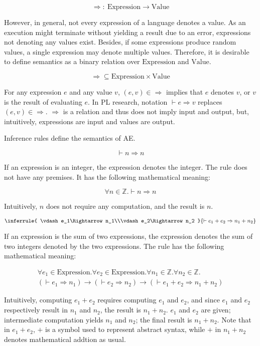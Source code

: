 \[\Rightarrow:\ \text{Expression}\rightarrow\text{Value}\]

However, in general, not every expression of a language denotes a value. As an
execution might terminate without yielding a result due to an error,
expressions not denoting any values exist. Besides, if some expressions
produce random values, a single expression may denote multiple values.
Therefore, it is desirable to define semantics as a binary relation over
\(\text{Expression}\) and \(\text{Value}\).

\[\Rightarrow\subseteq\text{Expression}\times\text{Value}\]

For any expression \(e\) and any value \(v\), \((e,v)\in\Rightarrow\) implies
that \(e\) denotes \(v\), or \(v\) is the result of evaluating \(e\). In PL
research, notation \(\vdash e\Rightarrow v\) replaces \((e,v)\in\Rightarrow\).
\(\Rightarrow\) is a relation and thus does not imply input and output, but,
intuitively, expressions are input and values are output.

Inference rules define the semantics of AE.

\[
\vdash n\Rightarrow n
\]

If an expression is an integer, the expression denotes the integer. The rule
does not have any premises. It has the following mathematical meaning:

\[ \forall n\in\mathbb{Z}.\vdash n\Rightarrow n \]

Intuitively, \(n\) does not require any computation, and the result is \(n\).

\[
\inferrule
{ \vdash e_1\Rightarrow n_1\\\vdash e_2\Rightarrow n_2 }
{ \vdash e_1+e_2\Rightarrow n_1+n_2 }
\]

If an expression is the sum of two expressions, the expression denotes the sum
of two integers denoted by the two expressions. The rule has the following
mathematical meaning:

\[
\begin{array}{l}
\forall e_1\in\text{Expression}.
\forall e_2\in\text{Expression}.
\forall n_1\in\mathbb{Z}.
\forall n_2\in\mathbb{Z}.\\
(\vdash e_1\Rightarrow n_1)\rightarrow
(\vdash e_2\Rightarrow n_2)\rightarrow
(\vdash e_1+e_2\Rightarrow n_1+n_2)
\end{array}
\]

Intuitively, computing \(e_1+e_2\) requires computing \(e_1\) and \(e_2\), and
since \(e_1\) and \(e_2\) respectively result in \(n_1\) and \(n_2\), the
result is \(n_1+n_2\). \(e_1\) and \(e_2\) are given; intermediate computation
yields \(n_1\) and \(n_2\); the final result is \(n_1+n_2\).
Note that
in \(e_1+e_2\), \(+\) is a symbol used to represent abstract syntax, while \(+\)
in \(n_1+n_2\) denotes mathematical addtion as usual.

